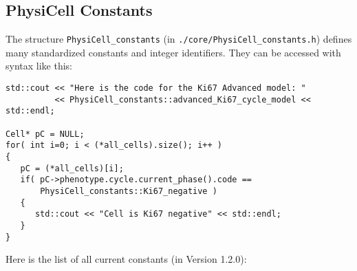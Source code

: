 \documentclass[12pt]{article}
\renewcommand{\v}{\verb}
\newcommand{\blue}[1]{\textcolor{blue}{#1}}
\newcommand{\DONE}{}%
\begin{document}
\subsection{PhysiCell Constants \DONE }
\label{sec:PhysiCell_constants}
The structure \v|PhysiCell_constants| (in 
\v|./core/PhysiCell_constants.h|) defines 
many standardized constants and integer identifiers. They 
can be accessed with syntax like this: 
\begin{verbatim}
std::cout << "Here is the code for the Ki67 Advanced model: "
          << PhysiCell_constants::advanced_Ki67_cycle_model << std::endl; 

Cell* pC = NULL; 
for( int i=0; i < (*all_cells).size(); i++ )
{
   pC = (*all_cells)[i]; 
   if( pC->phenotype.cycle.current_phase().code == 
       PhysiCell_constants::Ki67_negative )
   {
      std::cout << "Cell is Ki67 negative" << std::endl; 
   }
}
\end{verbatim}
%
Here is the list of all current constants (in Version 1.2.0): 
%
\end{document}
